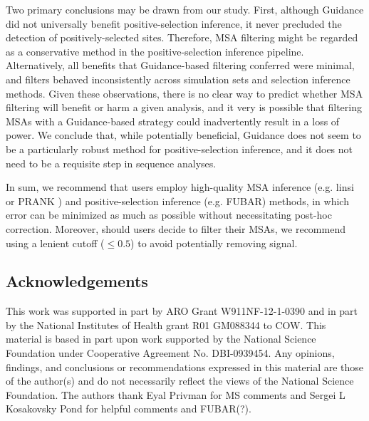 \documentclass[11pt]{article}
\begin{document}
Two primary conclusions may be drawn from our study. First, although Guidance did not universally benefit positive-selection inference, it never precluded the detection of positively-selected sites. Therefore, MSA filtering might be regarded as a conservative method in the positive-selection inference pipeline. Alternatively, all benefits that Guidance-based filtering conferred were minimal, and filters behaved inconsistently across simulation sets and selection inference methods. Given these observations, there is no clear way to predict whether MSA filtering will benefit or harm a given analysis, and it very is possible that filtering MSAs with a Guidance-based strategy could inadvertently result in a loss of power. We conclude that, while potentially beneficial, Guidance does not seem to be a particularly robust method for positive-selection inference, and it does not need to be a requisite step in sequence analyses.

In sum, we recommend that users employ high-quality MSA inference (e.g. linsi \citep{Katoh2005} or PRANK \citep{Loytynoja2008}) and positive-selection inference (e.g. FUBAR) methods, in which error can be minimized as much as possible without necessitating post-hoc correction. Moreover, should users decide to filter their MSAs, we recommend using a lenient cutoff ($\leq0.5$) to avoid potentially removing signal.


\subsection*{Acknowledgements}
This work was supported in part by ARO Grant W911NF-12-1-0390 and in part by the National Institutes of Health grant R01 GM088344 to COW. This material is based in part upon work supported by the National Science Foundation under Cooperative Agreement No. DBI-0939454. Any opinions, findings, and conclusions or recommendations expressed in this material are those of the author(s) and do not necessarily reflect the views of the National Science Foundation. The authors thank Eyal Privman for MS comments and Sergei L Kosakovsky Pond for helpful comments and FUBAR(?).



	

\newpage
\end{document}
